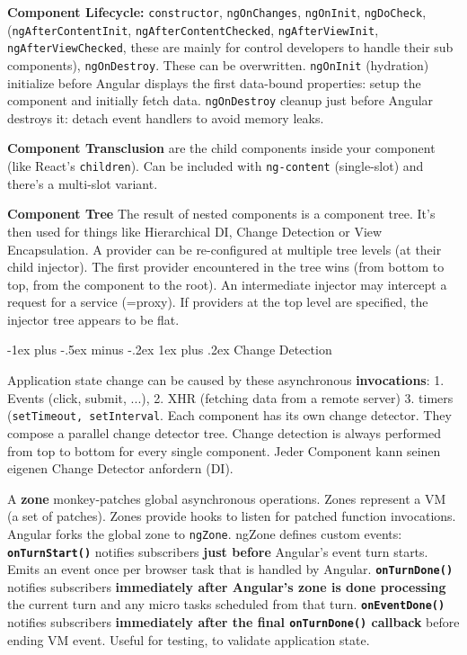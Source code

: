 \documentclass[a4paper, fontsize=6pt]{scrartcl}
\makeatletter
\renewcommand{\subsubsection}{\@startsection{subsubsection}{3}{0mm}%
    {-1ex plus -.5ex minus -.2ex}%
    {1ex plus .2ex}%
    {\normalfont\small\bfseries}}
\newcommand{\js}[1]{\texttt{#1}}
\makeatother
\begin{document}
\begin{multicols*}{5}
\textbf{Component Lifecycle:} \js{constructor}, \js{ngOnChanges}, \js{ngOnInit}, \js{ngDoCheck}, (\js{ngAfterContentInit}, \js{ngAfterContentChecked}, \js{ngAfterViewInit}, \js{ngAfterViewChecked}, these are mainly for control developers to handle their sub components), \js{ngOnDestroy}. These can be overwritten. \js{ngOnInit} (hydration) initialize before Angular displays the first data-bound properties: setup the component and initially fetch data. \js{ngOnDestroy} cleanup just before Angular destroys it: detach event handlers to avoid memory leaks.

\textbf{Component Transclusion} are the child components inside your component (like React's \js{children}). Can be included with \js{ng-content} (single-slot) and there's a multi-slot variant.

\textbf{Component Tree} The result of nested components is a component tree. It’s then used for things like Hierarchical DI, Change Detection or View Encapsulation. A provider can be re-configured at multiple tree levels (at their child injector). The first provider encountered in the tree wins (from bottom to top, from the component to the root). An intermediate injector may intercept a request for a service (=proxy). If providers at the top level are specified, the injector tree appears to be flat.

\subsubsection{Change Detection}

Application state change can be caused by these asynchronous \textbf{invocations}: 1. Events (click, submit, ...), 2. XHR (fetching data from a remote server) 3. timers (\js{setTimeout, setInterval}. Each component has its own change detector. They compose a parallel change detector tree. Change detection is always performed from top to bottom for every single component. Jeder Component kann seinen eigenen Change Detector anfordern (DI). 

A \textbf{zone} monkey-patches global asynchronous operations. Zones represent a VM (a set of patches). Zones provide hooks to listen for patched function invocations. Angular forks the global zone to \js{ngZone}. ngZone defines custom events: \textbf{\js{onTurnStart()}} notifies subscribers \textbf{just before} Angular's event turn starts. Emits an event once per browser task that is handled by Angular. \textbf{\js{onTurnDone()}} notifies subscribers \textbf{immediately after Angular's zone is done processing} the current turn and any micro tasks scheduled from that turn. \textbf{\js{onEventDone()}} notifies subscribers \textbf{immediately after the final \js{onTurnDone()} callback} before ending VM event. Useful for testing, to validate application state.


\end{multicols*}
\end{document}
